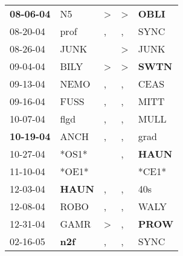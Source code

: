 \begin{supertabular}{p{0.07\textwidth}p{0.06\textwidth}p{0.02\textwidth}p{0.02\textwidth}p{0.06\textwidth}}
 \textbf{08-06-04\textsuperscript{}} &             N5\textsuperscript{} &     \textgreater &     \textgreater &  \textbf{OBLI\textsuperscript{}} \\
          08-20-04\textsuperscript{} &           prof\textsuperscript{} &                , &                , &           SYNC\textsuperscript{} \\
          08-26-04\textsuperscript{} &           JUNK\textsuperscript{} &                  &     \textgreater &           JUNK\textsuperscript{} \\
          09-04-04\textsuperscript{} &           BILY\textsuperscript{} &     \textgreater &     \textgreater &  \textbf{SWTN\textsuperscript{}} \\
          09-13-04\textsuperscript{} &           NEMO\textsuperscript{} &                , &                , &           CEAS\textsuperscript{} \\
          09-16-04\textsuperscript{} &           FUSS\textsuperscript{} &                , &                , &           MITT\textsuperscript{} \\
          10-07-04\textsuperscript{} &           flgd\textsuperscript{} &                , &                , &           MULL\textsuperscript{} \\
 \textbf{10-19-04\textsuperscript{}} &           ANCH\textsuperscript{} &                , &                , &           grad\textsuperscript{} \\
          10-27-04\textsuperscript{} &                            *OS1* &                  &                , &  \textbf{HAUN\textsuperscript{}} \\
          11-10-04\textsuperscript{} &                            *OE1* &                  &                  &                            *CE1* \\
          12-03-04\textsuperscript{} &  \textbf{HAUN\textsuperscript{}} &                , &                , &            40s\textsuperscript{} \\
          12-08-04\textsuperscript{} &           ROBO\textsuperscript{} &                , &                , &           WALY\textsuperscript{} \\
          12-31-04\textsuperscript{} &           GAMR\textsuperscript{} &     \textgreater &                , &  \textbf{PROW\textsuperscript{}} \\
          02-16-05\textsuperscript{} &   \textbf{n2f\textsuperscript{}} &                , &                , &           SYNC\textsuperscript{} \\

\end{supertabular}
